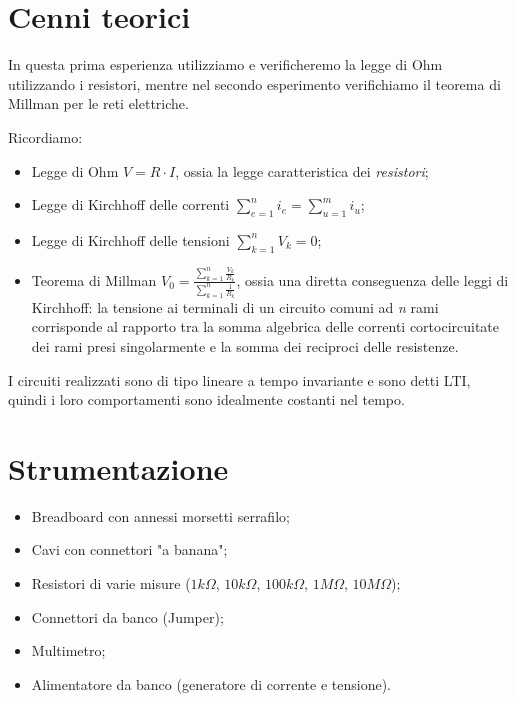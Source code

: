         
    \section{Cenni teorici}
    In questa prima esperienza utilizziamo e verificheremo la legge di Ohm utilizzando i resistori, mentre nel secondo esperimento
    verifichiamo il teorema di Millman per le reti elettriche. \par
    Ricordiamo:
    \begin{itemize}
        \item Legge di Ohm $V = R \cdot I$, ossia la legge caratteristica dei \textit{resistori};
        \item Legge di Kirchhoff delle correnti $\sum_{e = 1}^{n} i_e = \sum_{u = 1}^{m} i_u $;
        \item Legge di Kirchhoff delle tensioni $\sum_{k = 1}^{n} V_k = 0 $;
        \item Teorema di Millman $V_0 = \frac{\sum_{k = 1}^{n} \frac{V_k}{R_k} }{\sum_{k = 1}^{n} \frac{1}{R_k} }$, ossia una diretta conseguenza delle leggi di Kirchhoff: la tensione ai terminali di un circuito comuni ad \textit{n} rami
                corrisponde al rapporto tra la somma algebrica delle correnti cortocircuitate dei rami presi singolarmente e la somma dei reciproci delle resistenze.
    \end{itemize}
    I circuiti realizzati sono di tipo lineare a tempo invariante e sono detti LTI, quindi i loro comportamenti sono idealmente costanti nel tempo.
    
    
    \newpage
    \section{Strumentazione}
    \begin{itemize}
        \item Breadboard con annessi morsetti serrafilo;
        \item Cavi con connettori "a banana";
        \item Resistori di varie misure ($1k\Omega$, $10k\Omega$, $100k\Omega$, $1M\Omega$, $10M\Omega$);
        \item Connettori da banco (Jumper);
        \item Multimetro;
        \item Alimentatore da banco (generatore di corrente e tensione).
    \end{itemize}

